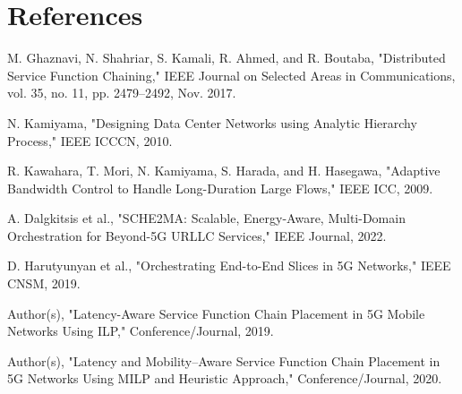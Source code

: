 \documentclass[conference]{IEEEtran}
\begin{document}
	\section{References}
	
	\begin{thebibliography}{99}
		
		M. Ghaznavi, N. Shahriar, S. Kamali, R. Ahmed, and R. Boutaba,  
		"Distributed Service Function Chaining,"  
		IEEE Journal on Selected Areas in Communications, vol. 35, no. 11, pp. 2479–2492, Nov. 2017.
		
		N. Kamiyama,  
		"Designing Data Center Networks using Analytic Hierarchy Process,"  
		IEEE ICCCN, 2010.
		
		R. Kawahara, T. Mori, N. Kamiyama, S. Harada, and H. Hasegawa,  
		"Adaptive Bandwidth Control to Handle Long-Duration Large Flows,"  
		IEEE ICC, 2009.
		
		A. Dalgkitsis et al.,  
		"SCHE2MA: Scalable, Energy-Aware, Multi-Domain Orchestration for Beyond-5G URLLC Services,"  
		IEEE Journal, 2022.
		
		D. Harutyunyan et al.,  
		"Orchestrating End-to-End Slices in 5G Networks,"  
		IEEE CNSM, 2019.
		
		Author(s),  
		"Latency-Aware Service Function Chain Placement in 5G Mobile Networks Using ILP,"  
		Conference/Journal, 2019.
		
		Author(s),  
		"Latency and Mobility–Aware Service Function Chain Placement in 5G Networks Using MILP and Heuristic Approach,"  
		Conference/Journal, 2020.
		
	\end{thebibliography}
	
\end{document}
